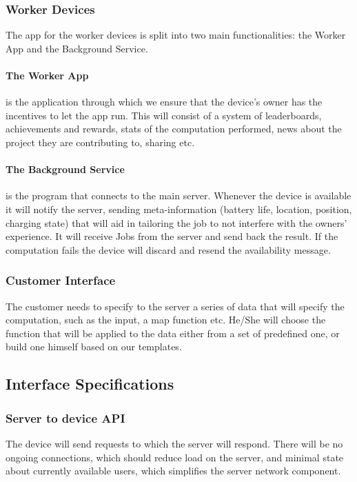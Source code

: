 \documentclass[a4paper,10pt]{article}
\begin{document}
\subsubsection{Worker Devices}
The app for the worker devices is split into two main functionalities: the Worker App and the Background Service. 

\paragraph{The Worker App}
is the application through which we ensure that the device's owner has the incentives to let the app run. This will consist of a system of leaderboards, achievements and rewards, stats of the  computation performed, news about the project they are contributing to, sharing etc.
\paragraph{The Background Service} 
is the program that connects to the main server. Whenever the device is available it will notify the server, sending meta-information (battery life, location, position, charging state) that will aid in tailoring the job to not interfere with the owners' experience. It will receive Jobs from the server and send back the result. If the computation fails the device will discard and resend the availability message.

\subsubsection{Customer Interface}
The customer needs to specify to the server a series of data that will specify the computation, such as the input, a map function etc. He/She will choose the function that will be applied to the data either from a set of predefined one, or build one himself based on our templates.

\subsection{Interface Specifications}


\subsubsection{Server to device API}

The device will send requests to which the server will respond.
There will be no ongoing connections, which should reduce load on the server, and minimal state about currently available users, which simplifies the server network component.
\end{document}
